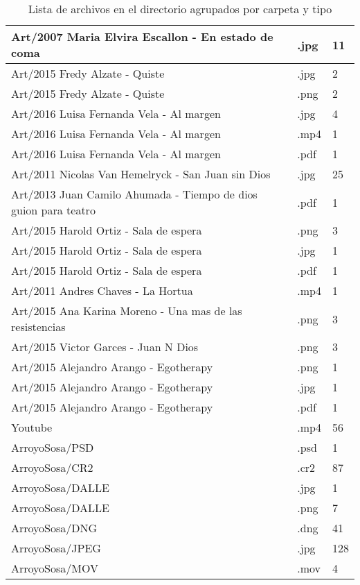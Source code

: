 \begin{table}[htbp]
\begin{tabular}{|l|l|l|}
    \hline
    Art/2007 Maria Elvira Escallon - En estado de coma & .jpg & 11 \\
    \hline
    Art/2015 Fredy Alzate - Quiste & .jpg & 2 \\
    \hline
    Art/2015 Fredy Alzate - Quiste & .png & 2 \\
    \hline
    Art/2016 Luisa Fernanda Vela - Al margen & .jpg & 4 \\
    \hline
    Art/2016 Luisa Fernanda Vela - Al margen & .mp4 & 1 \\
    \hline
    Art/2016 Luisa Fernanda Vela - Al margen & .pdf & 1 \\
    \hline
    Art/2011 Nicolas Van Hemelryck - San Juan sin Dios & .jpg & 25 \\
    \hline
    Art/2013 Juan Camilo Ahumada - Tiempo de dios guion para teatro & .pdf & 1 \\
    \hline
    Art/2015 Harold Ortiz - Sala de espera & .png & 3 \\
    \hline
    Art/2015 Harold Ortiz - Sala de espera & .jpg & 1 \\
    \hline
    Art/2015 Harold Ortiz - Sala de espera & .pdf & 1 \\
    \hline
    Art/2011 Andres Chaves - La Hortua & .mp4 & 1 \\
    \hline
    Art/2015 Ana Karina Moreno - Una mas de las resistencias & .png & 3 \\
    \hline
    Art/2015 Victor Garces - Juan N Dios & .png & 3 \\
    \hline
    Art/2015 Alejandro Arango - Egotherapy & .png & 1 \\
    \hline
    Art/2015 Alejandro Arango - Egotherapy & .jpg & 1 \\
    \hline
    Art/2015 Alejandro Arango - Egotherapy & .pdf & 1 \\
    \hline
    Youtube & .mp4 & 56 \\
    \hline
    ArroyoSosa/PSD & .psd & 1 \\
    \hline
    ArroyoSosa/CR2 & .cr2 & 87 \\
    \hline
    ArroyoSosa/DALLE & .jpg & 1 \\
    \hline
    ArroyoSosa/DALLE & .png & 7 \\
    \hline
    ArroyoSosa/DNG & .dng & 41 \\
    \hline
    ArroyoSosa/JPEG & .jpg & 128 \\
    \hline
    ArroyoSosa/MOV & .mov & 4 \\
    \hline
    \end{tabular}
    \caption{Lista de archivos en el directorio agrupados por carpeta y tipo}
    \end{table}
    